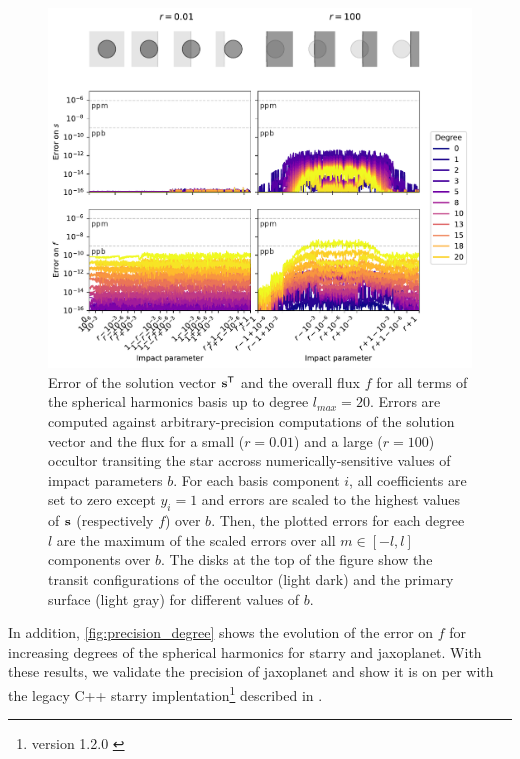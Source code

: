 \documentclass[modern]{aastex631}
\begin{document}
\begin{figure}[H]
    \begin{center}
        \includegraphics[width=\textwidth]{../workflows/precision/figures/error_jax.pdf}
        \caption{Error of the solution vector ${\mathbf{s}}^\mathsf{T}$ and the overall flux $f$ for all terms of the spherical harmonics basis up to degree $l_{max}=20$. Errors are computed against arbitrary-precision computations of the solution vector and the flux for a small ($r=0.01$) and a large ($r=100$) occultor transiting the star accross numerically-sensitive values of impact parameters $b$. For each basis component $i$, all coefficients are set to zero except $y_i=1$ and errors are scaled to the highest values of ${\mathbf{s}}$ (respectively $f$) over $b$. Then, the plotted errors for each degree $l$ are the maximum of the scaled errors over all $m\in [-l, l]$ components over $b$. The disks at the top of the figure show the transit configurations of the occultor (light dark) and the primary surface (light gray) for different values of $b$. }
        \label{fig:precision_s}
    \end{center}
\end{figure}
In addition, \autoref{fig:precision_degree} shows the evolution of the error on $f$ for increasing degrees of the spherical harmonics for \textsf{starry} and \textsf{jaxoplanet}. With these results, we validate the precision of \textsf{jaxoplanet} and show it is on per with the legacy C++ \textsf{starry} implentation\footnote{version 1.2.0 \citep{starry_120}} described in \cite{starry}.
\end{document}
